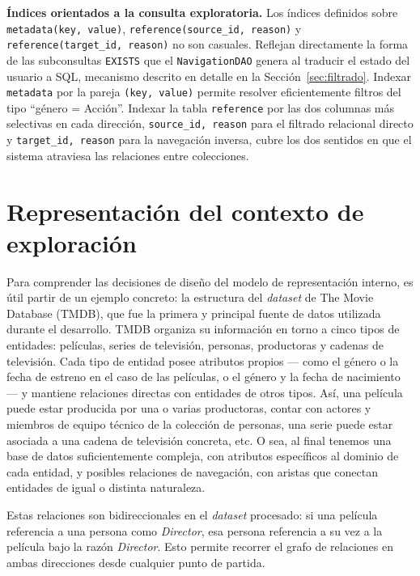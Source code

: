 \textbf{Índices orientados a la consulta exploratoria.}
Los índices definidos sobre \texttt{metadata(key, value)},
\texttt{reference(source\_id, reason)} y
\texttt{reference(target\_id, reason)} no son casuales. Reflejan
directamente la forma de las subconsultas \texttt{EXISTS} que el
\texttt{NavigationDAO} genera al traducir el estado del usuario a SQL,
mecanismo descrito en detalle en la Sección~\ref{sec:filtrado}.
Indexar \texttt{metadata} por la pareja \texttt{(key, value)} permite
resolver eficientemente filtros del tipo ``género = Acción''. Indexar
la tabla \texttt{reference} por las dos columnas más selectivas en
cada dirección, \texttt{source\_id, reason} para el filtrado
relacional directo y \texttt{target\_id, reason} para la navegación
inversa, cubre los dos sentidos en que el sistema atraviesa las
relaciones entre colecciones.

\section{Representación del contexto de exploración}
\label{sec:representacionContexto}

Para comprender las decisiones de diseño del modelo de representación interno, es útil partir de un ejemplo
concreto: la estructura del \textit{dataset} de The Movie Database (TMDB), que fue la primera y principal fuente de datos
utilizada durante el desarrollo. TMDB organiza su información en torno a cinco tipos
de entidades: películas, series de televisión, personas, productoras y cadenas de televisión.
Cada tipo de entidad posee atributos propios --- como el género o la fecha de estreno en el caso
de las películas, o el género y la fecha de nacimiento --- y mantiene
relaciones directas con entidades de otros tipos. Así, una película puede estar producida por
una o varias productoras, contar con actores y miembros de equipo técnico de la colección de
personas, una serie puede estar asociada a una cadena de televisión concreta, etc. O sea, al final tenemos una 
base de datos suficientemente compleja, con atributos específicos al dominio de cada entidad, y posibles relaciones de 
navegación, con aristas que conectan entidades de igual o distinta naturaleza.

Estas relaciones son bidireccionales en el \textit{dataset} procesado: si una película referencia a una
persona como \textit{Director}, esa persona referencia a su vez a la película bajo la razón
\textit{Director}. Esto permite recorrer el grafo de relaciones en ambas direcciones desde
cualquier punto de partida.


